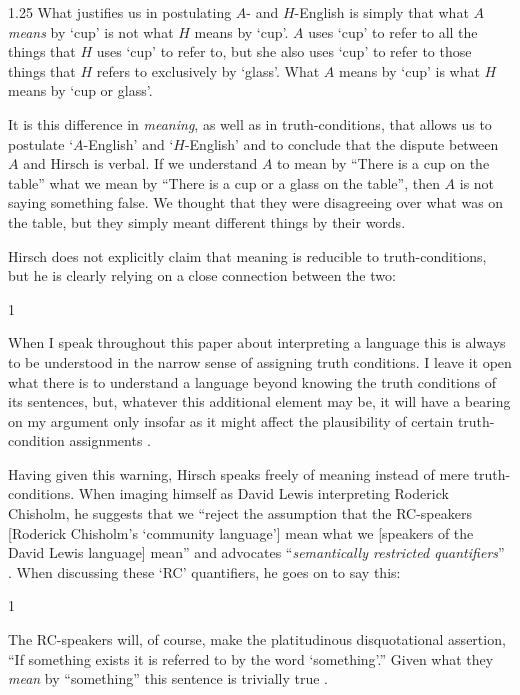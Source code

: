 \documentclass[11pt]{article}
\newenvironment{squote}{%
\begin{spacing}{1}
       	\begin{list}{}{%
\setlength{\labelwidth}{0pt}%
\rightmargin\leftmargin%
}
\item\relax
}{%
\end{list}%
\end{spacing}
}
\begin{document}
\begin{spacing}{1.25}
What justifies us in postulating $A$- and $H$-English is simply that
what $A$ {\em means} by `cup' is not what $H$ means by `cup'.  $A$
uses `cup' to refer to all the things that $H$ uses `cup' to refer to,
but she also uses `cup' to refer to those things that $H$ refers to
exclusively by `glass'.  What $A$ means by `cup' is what $H$ means by
`cup or glass'.

It is this difference in {\em meaning}, as well as in
truth-conditions, that allows us to postulate `$A$-English' and
`$H$-English' and to conclude that the dispute between $A$ and Hirsch
is verbal. If we understand $A$ to mean by ``There is a cup on the
table'' what we mean by ``There is a cup or a glass on the table'',
then $A$ is not saying something false.  We thought that they were
disagreeing over what was on the table, but they simply meant
different things by their words.

Hirsch does not explicitly claim that meaning is reducible to
truth-conditions, but he is clearly relying on a close connection
between the two:

\begin{squote}
When I speak throughout this paper about interpreting a language this
is always to be understood in the narrow sense of assigning truth
conditions.  I leave it open what there is to understand a language
beyond knowing the truth conditions of its sentences, but, whatever
this additional element may be, it will have a bearing on my argument
only insofar as it might affect the plausibility of certain
truth-condition assignments \citeyearpar[72]{hirsch2005}.
\end{squote}

Having given this warning, Hirsch speaks freely of meaning instead of
mere truth-conditions.  When imaging himself as David Lewis
interpreting Roderick Chisholm, he suggests that we ``reject the
assumption that the RC-speakers [Roderick Chisholm's `community
  language'] mean what we [speakers of the David Lewis language]
mean'' \citeyearpar[76]{hirsch2005} and advocates ``{\em semantically
  restricted quantifiers}'' \citeyearpar[76, his
  emphasis]{hirsch2005}.  When discussing these `RC' quantifiers, he
goes on to say this:

\begin{squote}
The RC-speakers will, of course, make the platitudinous disquotational
assertion, ``If something exists it is referred to by the word
`something'.''  Given what they {\em mean} by ``something'' this
sentence is trivially true \citeyearpar[77, my emphasis]{hirsch2005}.
\end{squote}


\end{spacing}
\end{document}
